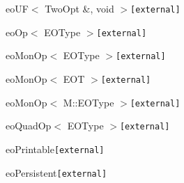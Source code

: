 \begin{CompactList}
\begin{CompactList}
\item eo\-UF$<$ Two\-Opt \&, void $>${\tt  [external]}\begin{CompactList}
\item {}
\begin{CompactList}
\item {}
\end{CompactList}
\end{CompactList}
\end{CompactList}
\item eo\-Op$<$ EOType $>${\tt  [external]}\begin{CompactList}
\item eo\-Mon\-Op$<$ EOType $>${\tt  [external]}\item eo\-Mon\-Op$<$ EOT $>${\tt  [external]}\item eo\-Mon\-Op$<$ M::EOType $>${\tt  [external]}\item eo\-Quad\-Op$<$ EOType $>${\tt  [external]}\end{CompactList}
\item eo\-Printable{\tt  [external]}\begin{CompactList}
\item eo\-Persistent{\tt  [external]}\begin{CompactList}
\item {}
\end{CompactList}
\end{CompactList}
\end{CompactList}
